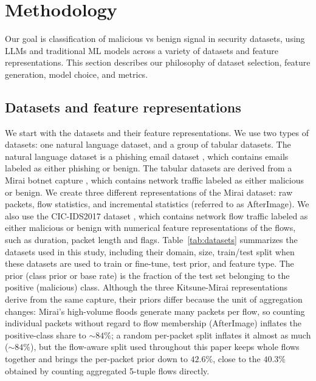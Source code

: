 \documentclass{jmlr}
\begin{document}
\section{Methodology}
\label{sec:methodology}
Our goal is classification of malicious vs benign signal in security datasets, using LLMs and traditional ML models across a variety of datasets and feature representations. This section describes our philosophy of dataset selection, feature generation, model choice, and metrics.
\subsection{Datasets and feature representations}
\label{sec:datasets-and-features}

We start with the datasets and their feature representations. We use two types of datasets: one natural language dataset, and a group of tabular datasets. The natural language dataset is a phishing email dataset \citep{liu2023phishing}, which contains emails labeled as either phishing or benign. The tabular datasets are derived from a Mirai botnet capture \citep{mirsky2018kitsune}, which contains network traffic labeled as either malicious or benign. We create three different representations of the Mirai dataset: raw packets, flow statistics, and incremental statistics (referred to as AfterImage). We also use the CIC-IDS2017 dataset \citep{sharafaldin2018cicids}, which contains network flow traffic labeled as either malicious or benign with numerical feature representations of the flows, such as duration, packet length and flags. Table~\ref{tab:datasets} summarizes the datasets used in this study, including their domain, size, train/test split when these datasets are used to train or fine-tune, test prior, and feature type.  The prior (class prior or base rate) is the fraction of the test set belonging to the positive (malicious) class. Although the three Kitsune-Mirai representations derive from the same capture, their priors differ because the unit of aggregation changes: Mirai's high-volume floods generate many packets per flow, so counting individual packets without regard to flow membership (AfterImage) inflates the positive-class share to ${\sim}84\%$; a random per-packet split inflates it almost as much (${\sim}84\%$), but the flow-aware split used throughout this paper keeps whole flows together and brings the per-packet prior down to $42.6\%$, close to the $40.3\%$ obtained by counting aggregated 5-tuple flows directly.
\end{document}
